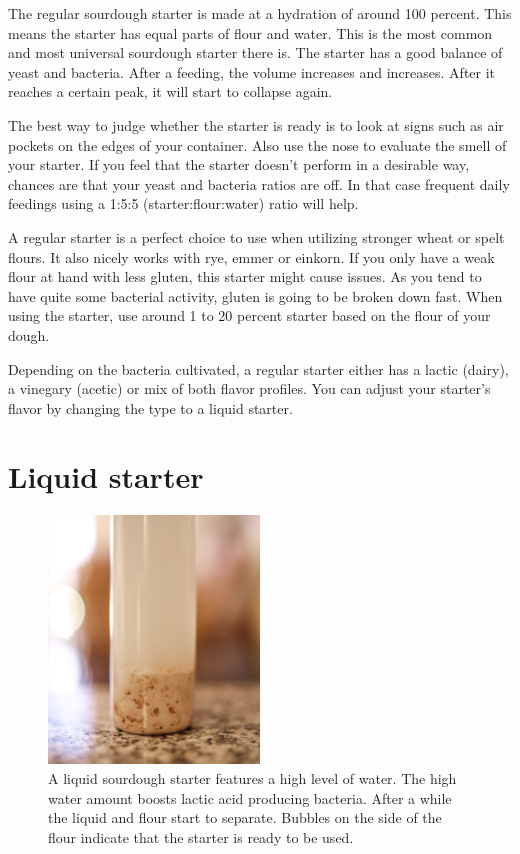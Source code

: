 The regular sourdough starter is made at a hydration of around 100 percent.
This means the starter has equal parts of flour and water. This is the most
common and most universal sourdough starter there is. The starter has a good
balance of yeast and bacteria. After a feeding, the volume increases and
increases. After it reaches a certain peak, it will start to collapse again.

The best way to judge whether the starter is ready is to look at signs such as
air pockets on the edges of your container. Also use the nose to evaluate the
smell of your starter. If you feel that the starter doesn't perform in a
desirable way, chances are that your yeast and bacteria ratios are off. In that
case frequent daily feedings using a 1:5:5 (starter:flour:water) ratio will
help.

A regular starter is a perfect choice to use when utilizing stronger wheat or spelt flours.
It also nicely works with rye, emmer or einkorn. If you only have a weak flour
at hand with less gluten, this starter might cause issues. As you tend to have
quite some bacterial activity, gluten is going to be broken down fast. When
using the starter, use around 1 to 20 percent starter based on the flour of your
dough.

Depending on the bacteria cultivated, a regular starter either has a lactic (dairy),
a vinegary (acetic) or mix of both flavor profiles. You can adjust your
starter's flavor by changing the type to a liquid starter.

\section{Liquid starter}%
\label{section:liquid-starter}

\begin{figure}[!htb]
\begin{center}
  \includegraphics[width=0.5\textwidth]{sourdough-starter-liquid.jpg}
  \caption{A liquid sourdough starter features a high level of water. The high
  water amount boosts lactic acid producing bacteria. After a while the liquid
  and flour start to separate. Bubbles on the side of the flour
  indicate that the starter is ready to be used.}%
  \label{fig:liquid-sourdough-starter}
\end{center}
\end{figure}


